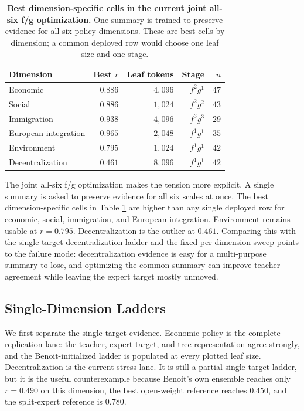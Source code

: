 \begin{table}[t]
  \centering
  \begin{tabular}{lrrrr}
    \toprule
    Dimension & Best $r$ & Leaf tokens & Stage & $n$ \\
    \midrule
    Economic & $0.886$ & $4{,}096$ & $f^2g^1$ & $47$ \\
    Social & $0.886$ & $1{,}024$ & $f^2g^2$ & $43$ \\
    Immigration & $0.938$ & $4{,}096$ & $f^3g^3$ & $29$ \\
    European integration & $0.965$ & $2{,}048$ & $f^1g^1$ & $35$ \\
    Environment & $0.795$ & $1{,}024$ & $f^1g^1$ & $42$ \\
    Decentralization & $0.461$ & $8{,}096$ & $f^1g^1$ & $42$ \\
    \bottomrule
  \end{tabular}
  \caption{\textbf{Best dimension-specific cells in the current joint
  all-six f/g optimization.} One summary is trained to preserve evidence for
  all six policy dimensions. These are best cells by dimension; a common
  deployed row would choose one leaf size and one stage.}
  \label{tab:v6-joint-dim-best}
\end{table}

The joint all-six f/g optimization makes the tension more explicit. A single
summary is asked to preserve evidence for all six scales at once. The best
dimension-specific cells in Table \ref{tab:v6-joint-dim-best} are higher
than any single deployed row for economic, social, immigration, and European
integration. Environment remains usable at $r=0.795$. Decentralization is
the outlier at $0.461$. Comparing this with the single-target
decentralization ladder and the fixed per-dimension sweep points to the
failure mode: decentralization evidence is easy for a multi-purpose summary
to lose, and optimizing the common summary can improve teacher agreement
while leaving the expert target mostly unmoved.

\subsection{Single-Dimension Ladders}\label{sec:min-manifesto-single-dim}

We first separate the single-target evidence. Economic policy is the complete
replication lane: the teacher, expert target, and tree representation agree
strongly, and the Benoit-initialized ladder is populated at every plotted leaf
size. Decentralization is the current stress lane. It is still a partial
single-target ladder, but it is the useful counterexample because Benoit's own
ensemble reaches only $r=0.490$ on this dimension, the best open-weight
reference reaches $0.450$, and the split-expert reference is
$0.780$.

